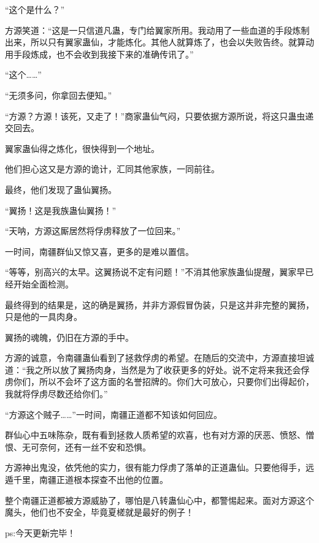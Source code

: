 \begin{this_body}
“这个是什么？”

方源笑道：“这是一只信道凡蛊，专门给翼家所用。我动用了一些血道的手段炼制出来，所以只有翼家蛊仙，才能炼化。其他人就算炼了，也会以失败告终。就算动用手段炼成，也不会收到我接下来的准确传讯了。”

“这个……”

“无须多问，你拿回去便知。”

“方源？方源！该死，又走了！”商家蛊仙气闷，只要依据方源所说，将这只蛊虫递交回去。

翼家蛊仙得之炼化，很快得到一个地址。

他们担心这又是方源的诡计，汇同其他家族，一同前往。

最终，他们发现了蛊仙翼扬。

“翼扬！这是我族蛊仙翼扬！”

“天呐，方源这厮居然将俘虏释放了一位回来。”

一时间，南疆群仙又惊又喜，更多的是难以置信。

“等等，别高兴的太早。这翼扬说不定有问题！”不消其他家族蛊仙提醒，翼家早已经开始全面检测。

最终得到的结果是，这的确是翼扬，并非方源假冒伪装，只是这并非完整的翼扬，只是他的一具肉身。

翼扬的魂魄，仍旧在方源的手中。

方源的诚意，令南疆蛊仙看到了拯救俘虏的希望。在随后的交流中，方源直接坦诚道：“我之所以放了翼扬肉身，当然是为了收获更多的好处。说不定将来我还会俘虏你们，所以不会坏了这方面的名誉招牌的。你们大可放心，只要你们出得起价，我就将俘虏尽数还给你们。”

“方源这个贼子……”一时间，南疆正道都不知该如何回应。

群仙心中五味陈杂，既有看到拯救人质希望的欢喜，也有对方源的厌恶、愤怒、憎恨、无可奈何，还有一丝不安和恐惧。

方源神出鬼没，依凭他的实力，很有能力俘虏了落单的正道蛊仙。只要他得手，远遁千里，南疆正道根本探查不出他的位置。

整个南疆正道都被方源威胁了，哪怕是八转蛊仙心中，都警惕起来。面对方源这个魔头，他们也不安全，毕竟夏槎就是最好的例子！

ps:今天更新完毕！

\end{this_body}

